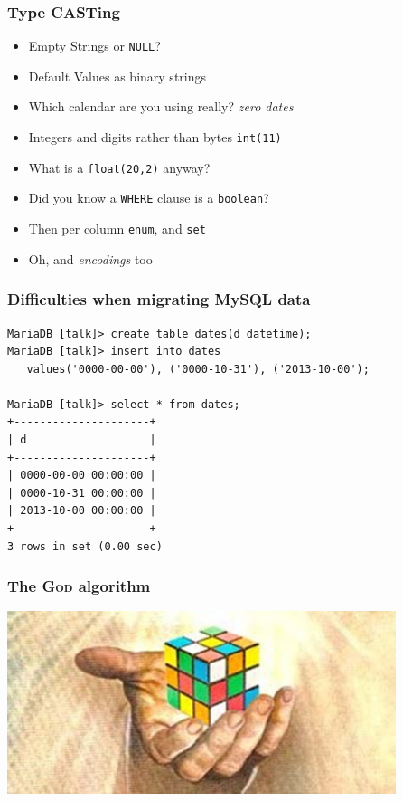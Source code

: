 \documentclass{beamer}
\begin{document}
\begin{frame}
  \frametitle{Type CASTing}

  \vfill

  \begin{itemize}
  \item Empty Strings or \texttt{NULL}?
  \item Default Values as binary strings
  \item Which calendar are you using really? \textit{zero dates}
  \item Integers and digits rather than bytes \texttt{int(11)}
  \item What is a \texttt{float(20,2)} anyway?
  \item Did you know a \texttt{WHERE} clause is a \texttt{boolean}?
  \item Then per column \texttt{enum}, and \texttt{set}
  \item Oh, and \textit{\Large encodings} too
  \end{itemize}  
\end{frame}

\begin{frame}[fragile]
  \frametitle{Difficulties when migrating MySQL data}
  
  \vfill

\begin{verbatim}
MariaDB [talk]> create table dates(d datetime);
MariaDB [talk]> insert into dates
   values('0000-00-00'), ('0000-10-31'), ('2013-10-00');

MariaDB [talk]> select * from dates;
+---------------------+
| d                   |
+---------------------+
| 0000-00-00 00:00:00 |
| 0000-10-31 00:00:00 |
| 2013-10-00 00:00:00 |
+---------------------+
3 rows in set (0.00 sec)
\end{verbatim}
\end{frame}

\begin{frame}[fragile]
  \frametitle{The \textsc{God} algorithm}

  \begin{center}
    \includegraphics[height=2.1in]{god-has-spoken-algorithm-reveals-secret-number-for-rubiks-cube.jpg}
  \end{center}
\end{frame}
\end{document}

